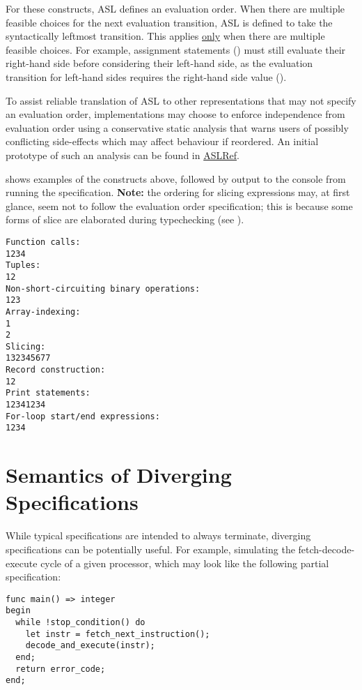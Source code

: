 For these constructs, ASL defines an evaluation order.
When there are multiple feasible choices for the next evaluation transition, ASL is defined to take the syntactically leftmost transition.
This applies \underline{only} when there are multiple feasible choices.
For example, assignment statements () must still evaluate their right-hand side before considering their left-hand side, as the evaluation transition for left-hand sides requires the right-hand side value ().

To assist reliable translation of ASL to other representations that may not specify an evaluation order, implementations may choose to enforce independence from evaluation order using a conservative static analysis that warns users of possibly conflicting side-effects which may affect behaviour if reordered.
An initial prototype of such an analysis can be found in \href{https://github.com/herd/herdtools7/blob/\VERSION/asllib/SideEffect.ml}{ASLRef}.

 shows examples of the constructs above, followed by output to the console from running the specification.
\textbf{Note:} the ordering for slicing expressions may, at first glance, seem not to follow the evaluation order specification; this is because some forms of slice are elaborated during typechecking (see ).
\begin{Verbatim}[fontsize=\footnotesize, frame=single]
Function calls:
1234
Tuples:
12
Non-short-circuiting binary operations:
123
Array-indexing:
1
2
Slicing:
132345677
Record construction:
12
Print statements:
12341234
For-loop start/end expressions:
1234
\end{Verbatim}

\section{Semantics of Diverging Specifications\label{sec:Semantics of Diverging Specifications}}
While typical specifications are intended to always terminate,
diverging specifications can be potentially useful.
For example, simulating the fetch-decode-execute cycle of a given processor,
which may look like the following partial specification:
\begin{lstlisting}
func main() => integer
begin
  while !stop_condition() do
    let instr = fetch_next_instruction();
    decode_and_execute(instr);
  end;
  return error_code;
end;
\end{lstlisting}

